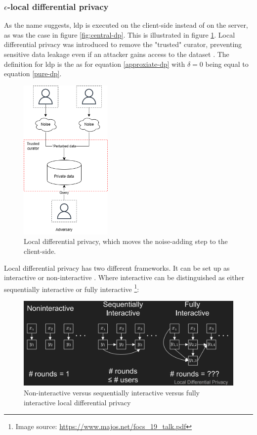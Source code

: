 \subsubsection{$\epsilon$-local differential privacy}
As the name suggests, \gls{ldp} is executed on the client-side instead of on the server, as was the case in figure \ref{fig:central-dp}.
This is illustrated in figure \ref{fig:local-dp}.
Local differential privacy was introduced to remove the "trusted" curator, preventing sensitive data leakage even if an attacker gains access to the dataset \citep{del_rey_comprehensive_2020}.
The definition for \gls{ldp} is the as for equation \ref{approxiate-dp} with $\delta = 0$ being equal to equation \ref{pure-dp}.
\begin{figure}[ht]
  \includegraphics[width=0.4\textwidth]{TheorethicalFramework/Differential privacy/master-thesis-Pagina-8.png}
  \caption{Local differential privacy, which moves the noise-adding step to the client-side.}
  \label{fig:local-dp}
\end{figure}
Local differential privacy has two different frameworks.
It can be set up as interactive or non-interactive \citep{del_rey_comprehensive_2020}.
Where interactive can be distinguished as either sequentially interactive or fully interactive \footnote{Image source: \url{https://www.majos.net/focs_19_talk.pdf}}:
\begin{figure}[H]
  \includegraphics[width=\textwidth]{TheorethicalFramework/nont-interactive-versus-interactive.png}
  \caption{Non-interactive versus sequentially interactive versus fully interactive local differential privacy \citep{joseph_role_2019-1}}
  \label{fig:non-interactive-versus-interactive}
\end{figure}

